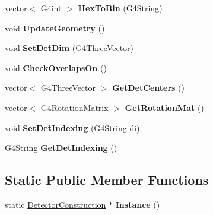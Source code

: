 \begin{DoxyCompactItemize}
vector$<$ G4int $>$ {\bfseries Hex\+To\+Bin} (G4\+String)
\item 
\hypertarget{class_detector_construction_a2742ef0ae83433992902a56693f2c6e5}{}\label{class_detector_construction_a2742ef0ae83433992902a56693f2c6e5} 
void {\bfseries Update\+Geometry} ()
\item 
\hypertarget{class_detector_construction_aad284f21239ea4e1f180f5c09e464bc4}{}\label{class_detector_construction_aad284f21239ea4e1f180f5c09e464bc4} 
void {\bfseries Set\+Det\+Dim} (G4\+Three\+Vector)
\item 
\hypertarget{class_detector_construction_a863b154ff7ba8dbfc86117a62ac53b93}{}\label{class_detector_construction_a863b154ff7ba8dbfc86117a62ac53b93} 
void {\bfseries Check\+Overlaps\+On} ()
\item 
\hypertarget{class_detector_construction_a3d77b1fc69db8fad1d4ff8f42409eb29}{}\label{class_detector_construction_a3d77b1fc69db8fad1d4ff8f42409eb29} 
vector$<$ G4\+Three\+Vector $>$ {\bfseries Get\+Det\+Centers} ()
\item 
\hypertarget{class_detector_construction_a0587765cb3f7e035fd355bac97d11141}{}\label{class_detector_construction_a0587765cb3f7e035fd355bac97d11141} 
vector$<$ G4\+Rotation\+Matrix $>$ {\bfseries Get\+Rotation\+Mat} ()
\item 
\hypertarget{class_detector_construction_a3dec0f5c03b83ef31bc78890a60cb1b9}{}\label{class_detector_construction_a3dec0f5c03b83ef31bc78890a60cb1b9} 
void {\bfseries Set\+Det\+Indexing} (G4\+String di)
\item 
\hypertarget{class_detector_construction_a0aeae93f2119338df2e3dd88508afb82}{}\label{class_detector_construction_a0aeae93f2119338df2e3dd88508afb82} 
G4\+String {\bfseries Get\+Det\+Indexing} ()
\end{DoxyCompactItemize}
\subsection*{Static Public Member Functions}
\begin{DoxyCompactItemize}
\item 
\hypertarget{class_detector_construction_ab85e322ba1122fe6f60a58448a36ad7a}{}\label{class_detector_construction_ab85e322ba1122fe6f60a58448a36ad7a} 
static \hyperlink{class_detector_construction}{Detector\+Construction} $\ast$ {\bfseries Instance} ()
\end{DoxyCompactItemize}
